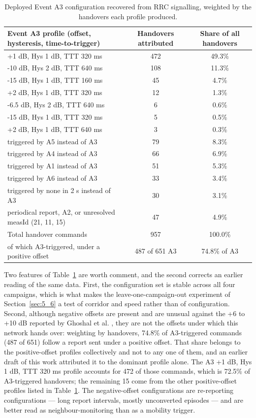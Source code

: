 \begin{table}[htbp]
\centering
\caption{Deployed Event A3 configuration recovered from RRC signalling, weighted by the handovers each profile produced.}
\label{tab:3_1}
\vspace{0.4em}
\singlespacing
\small
\begin{tabularx}{\linewidth}{X c c}
\toprule
\textbf{Event A3 profile (offset, hysteresis, time-to-trigger)} & \textbf{Handovers attributed} & \textbf{Share of all handovers} \\
\midrule
+1 dB, Hys 1 dB, TTT 320 ms & 472 & 49.3\% \\
-10 dB, Hys 2 dB, TTT 640 ms & 108 & 11.3\% \\
-15 dB, Hys 1 dB, TTT 160 ms & 45 & 4.7\% \\
+2 dB, Hys 1 dB, TTT 320 ms & 12 & 1.3\% \\
-6.5 dB, Hys 2 dB, TTT 640 ms & 6 & 0.6\% \\
-15 dB, Hys 1 dB, TTT 320 ms & 5 & 0.5\% \\
+2 dB, Hys 1 dB, TTT 640 ms & 3 & 0.3\% \\
triggered by A5 instead of A3 & 79 & 8.3\% \\
triggered by A4 instead of A3 & 66 & 6.9\% \\
triggered by A1 instead of A3 & 51 & 5.3\% \\
triggered by A6 instead of A3 & 33 & 3.4\% \\
triggered by none in 2 s instead of A3 & 30 & 3.1\% \\
periodical report, A2, or unresolved measId (21, 11, 15) & 47 & 4.9\% \\
Total handover commands & 957 & 100.0\% \\
of which A3-triggered, under a positive offset & 487 of 651 A3 & 74.8\% of A3 \\
\bottomrule
\end{tabularx}
\end{table}

Two features of Table~\ref{tab:3_1} are worth comment, and the second corrects an earlier reading of the same data. First, the configuration set is stable across all four campaigns, which is what makes the leave-one-campaign-out experiment of Section~\ref{sec:5_6} a test of corridor and speed rather than of configuration. Second, although negative offsets are present and are unusual against the +6 to +10 dB reported by Ghoshal et al. \cite{ref4}, they are not the offsets under which this network hands over: weighting by handovers, 74.8\% of A3-triggered commands (487 of 651) follow a report sent under a positive offset. That share belongs to the positive-offset profiles collectively and not to any one of them, and an earlier draft of this work attributed it to the dominant profile alone. The A3 +1 dB, Hys 1 dB, TTT 320 ms profile accounts for 472 of those commands, which is 72.5\% of A3-triggered handovers; the remaining 15 come from the other positive-offset profiles listed in Table~\ref{tab:3_1}. The negative-offset configurations are re-reporting configurations --- long report intervals, mostly unconverted episodes --- and are better read as neighbour-monitoring than as a mobility trigger.

